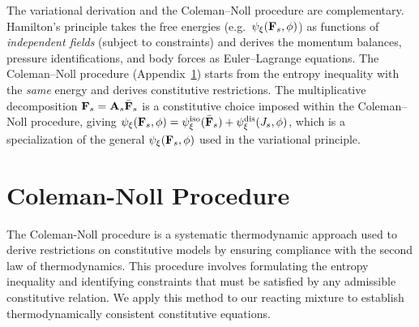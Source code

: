 \documentclass[11pt]{article}
\begin{document}
The variational derivation and the Coleman--Noll procedure are complementary.  Hamilton's principle takes the free energies (e.g.\ $\psi_\xi(\mathbf{F}_s, \phi)$) as functions of \emph{independent fields} (subject to constraints) and derives the momentum balances, pressure identifications, and body forces as Euler--Lagrange equations.  The Coleman--Noll procedure (Appendix~\ref{sec:coleman}) starts from the entropy inequality with the \emph{same} energy and derives constitutive restrictions.  The multiplicative decomposition $\mathbf{F}_s = \mathbf{A}_s \bar{\mathbf{F}}_s$ is a constitutive choice imposed within the Coleman--Noll procedure, giving $\psi_\xi(\mathbf{F}_s, \phi) = \psi^{\text{iso}}_\xi(\bar{\mathbf{F}}_s) + \psi^{\text{dis}}_\xi(J_s, \phi)$, which is a specialization of the general $\psi_\xi(\mathbf{F}_s, \phi)$ used in the variational principle.


\section{Coleman-Noll Procedure}
\label{sec:coleman}

The Coleman-Noll procedure is a systematic thermodynamic approach used to derive restrictions on constitutive models by ensuring compliance with the second law of thermodynamics. This procedure involves formulating the entropy inequality and identifying constraints that must be satisfied by any admissible constitutive relation. We apply this method to our reacting mixture to establish thermodynamically consistent constitutive equations.
\end{document}
